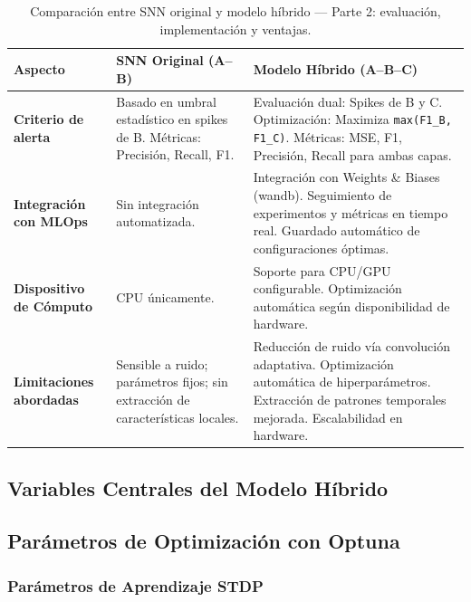 \begin{table}[!htbp]
\centering
\small
\renewcommand{\arraystretch}{1.3}
\begin{tabularx}{0.99\textwidth}{>{\hsize=0.5\hsize\raggedright\arraybackslash}X
                                 >{\hsize=1.2\hsize\raggedright\arraybackslash}X
                                 >{\hsize=1.3\hsize\raggedright\arraybackslash}X}
\hline\hline
\textbf{Aspecto} & \textbf{SNN Original (A--B)} & \textbf{Modelo Híbrido (A--B--C)} \\
\hline
\textbf{Criterio de alerta} & 
Basado en umbral estadístico en spikes de B.  
Métricas: Precisión, Recall, F1. & 
Evaluación dual: Spikes de B y C.  
Optimización: Maximiza \texttt{max(F1\_B, F1\_C)}.  
Métricas: MSE, F1, Precisión, Recall para ambas capas. \\
\hline
\textbf{Integración con MLOps} & 
Sin integración automatizada. & 
Integración con Weights \& Biases (wandb).  
Seguimiento de experimentos y métricas en tiempo real.  
Guardado automático de configuraciones óptimas. \\
\hline
\textbf{Dispositivo de Cómputo} & 
CPU únicamente. & 
Soporte para CPU/GPU configurable.  
Optimización automática según disponibilidad de hardware. \\
\hline
\textbf{Limitaciones abordadas} & 
Sensible a ruido; parámetros fijos; sin extracción de características locales. & 
Reducción de ruido vía convolución adaptativa.  
Optimización automática de hiperparámetros.  
Extracción de patrones temporales mejorada.  
Escalabilidad en hardware. \\
\hline\hline
\end{tabularx}
\caption{Comparación entre SNN original y modelo híbrido — Parte 2: evaluación, implementación y ventajas.}
\label{tab:comparacion-arquitecturas-2}
\end{table}


\subsection{Variables Centrales del Modelo Híbrido}

\subsection{Parámetros de Optimización con Optuna}

\subsubsection*{Parámetros de Aprendizaje STDP}

